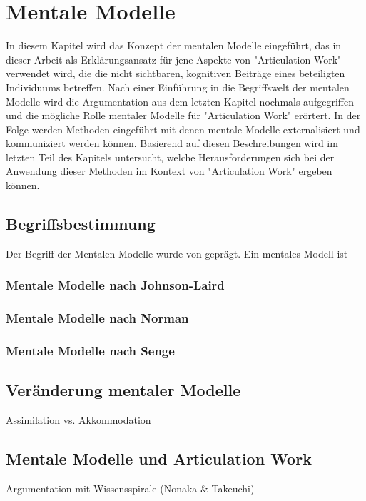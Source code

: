 \chapter{Mentale Modelle}
\label{cha:mentale_modelle}

In diesem Kapitel wird das Konzept der mentalen Modelle eingeführt, das in dieser Arbeit als Erklärungsansatz für jene Aspekte von "Articulation Work" verwendet wird, die die nicht sichtbaren, kognitiven Beiträge eines beteiligten Individuums betreffen. Nach einer Einführung in die Begriffswelt der mentalen Modelle wird die Argumentation aus dem letzten Kapitel nochmals aufgegriffen und die mögliche Rolle mentaler Modelle für "Articulation Work" erörtert. In der Folge werden Methoden eingeführt mit denen mentale Modelle externalisiert und kommuniziert werden können. Basierend auf diesen Beschreibungen wird im letzten Teil des Kapitels untersucht, welche Herausforderungen sich bei der Anwendung dieser Methoden im Kontext von "Articulation Work" ergeben können.

\section{Begriffsbestimmung}
\label{sec:mentalemodelle_begriffsbestimmung}

Der Begriff der Mentalen Modelle wurde von \citet{Johnson-Laird81} geprägt. Ein mentales Modell ist 

\subsection{Mentale Modelle nach Johnson-Laird} %
\label{sub:mentale_modelle_nach_johnson_laird}


\subsection{Mentale Modelle nach Norman} %
\label{sub:mentale_modelle_nach_norman}


\subsection{Mentale Modelle nach Senge} %
\label{sub:mentale_modelle_nach_senge}


\section{Veränderung mentaler Modelle}
\label{sub:veränderung_mentaler_modelle}
Assimilation vs. Akkommodation

\section{Mentale Modelle und Articulation Work}
\label{sec:mentale_modelle_und_articulation_work}

Argumentation mit Wissensspirale (Nonaka \& Takeuchi)
